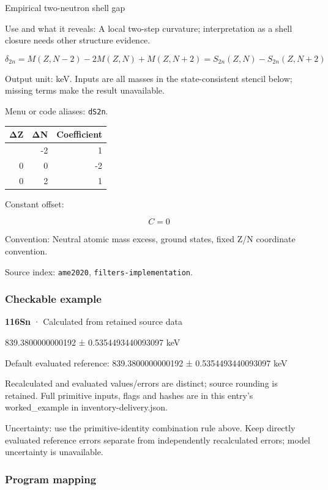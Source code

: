 \documentclass[
  11pt,
  letterpaper,
]{article}
\begin{document}
Empirical two-neutron shell gap

Use and what it reveals: A local two-step curvature; interpretation as a
shell closure needs other structure evidence.

\[
\delta_{2n}=M(Z,N-2)-2M(Z,N)+M(Z,N+2)=S_{2n}(Z,N)-S_{2n}(Z,N+2)
\]

Output unit: keV. Inputs are all masses in the state-consistent stencil
below; missing terms make the result unavailable.

Menu or code aliases: \texttt{dS2n}.

\begin{longtable}[]{@{}rrr@{}}
\toprule\noalign{}
ΔZ & ΔN & Coefficient \\
\midrule\noalign{}
\endhead
\bottomrule\noalign{}
\endlastfoot
0 & -2 & 1 \\
0 & 0 & -2 \\
0 & 2 & 1 \\
\end{longtable}

Constant offset:

\[
C=0
\]

Convention: Neutral atomic mass excess, ground states, fixed Z/N
coordinate convention.

Source index: \texttt{ame2020}, \texttt{filters-implementation}.

\subsubsection{Checkable example}\label{checkable-example-20}

\textbf{116Sn} · Calculated from retained source data

839.3800000000192 ± 0.5354493440093097 keV

Default evaluated reference: 839.3800000000192 ± 0.5354493440093097 keV

Recalculated and evaluated values/errors are distinct; source rounding
is retained. Full primitive inputs, flags and hashes are in this entry's
worked\_example in inventory-delivery.json.

Uncertainty: use the primitive-identity combination rule above. Keep
directly evaluated reference errors separate from independently
recalculated errors; model uncertainty is unavailable.

\subsubsection{Program mapping}\label{program-mapping-20}
\end{document}
